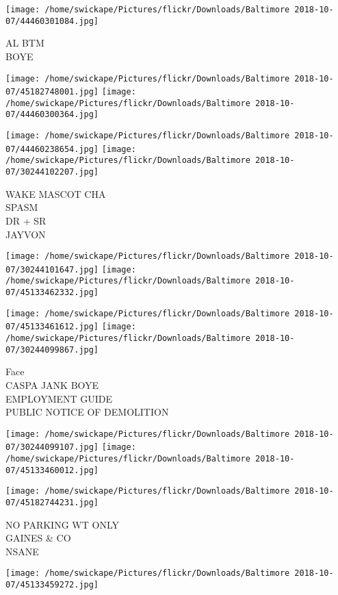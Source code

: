 \documentclass[10pt,letterpaper]{article}
\begin{document}
\vspace{0.25in}
\texttt{[image: /home/swickape/Pictures/flickr/Downloads/Baltimore 2018-10-07/44460301084.jpg]}

AL BTM\\
BOYE
\pagebreak

\texttt{[image: /home/swickape/Pictures/flickr/Downloads/Baltimore 2018-10-07/45182748001.jpg]}
\texttt{[image: /home/swickape/Pictures/flickr/Downloads/Baltimore 2018-10-07/44460300364.jpg]}

\texttt{[image: /home/swickape/Pictures/flickr/Downloads/Baltimore 2018-10-07/44460238654.jpg]}
\texttt{[image: /home/swickape/Pictures/flickr/Downloads/Baltimore 2018-10-07/30244102207.jpg]}

WAKE MASCOT CHA\\
SPASM\\
DR + SR\\
JAYVON
\pagebreak

\texttt{[image: /home/swickape/Pictures/flickr/Downloads/Baltimore 2018-10-07/30244101647.jpg]}
\texttt{[image: /home/swickape/Pictures/flickr/Downloads/Baltimore 2018-10-07/45133462332.jpg]}

\texttt{[image: /home/swickape/Pictures/flickr/Downloads/Baltimore 2018-10-07/45133461612.jpg]}
\texttt{[image: /home/swickape/Pictures/flickr/Downloads/Baltimore 2018-10-07/30244099867.jpg]}

Face\\
CASPA JANK BOYE\\
EMPLOYMENT GUIDE\\
PUBLIC NOTICE OF DEMOLITION
\pagebreak

\texttt{[image: /home/swickape/Pictures/flickr/Downloads/Baltimore 2018-10-07/30244099107.jpg]}
\texttt{[image: /home/swickape/Pictures/flickr/Downloads/Baltimore 2018-10-07/45133460012.jpg]}

\vspace{0.25in}
\texttt{[image: /home/swickape/Pictures/flickr/Downloads/Baltimore 2018-10-07/45182744231.jpg]}

NO PARKING WT ONLY\\
GAINES \& CO\\
NSANE
\pagebreak

\texttt{[image: /home/swickape/Pictures/flickr/Downloads/Baltimore 2018-10-07/45133459272.jpg]}
\end{document}
